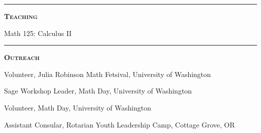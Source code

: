 \documentclass[12pt]{article}
\newcommand{\sectionheading}[1]
{
\bigskip %
\noindent
\hspace{-6.5mm}\textcolor{Gray}{\rule[.75mm]{21.5mm}{1mm}} %
\hspace{.2mm}	%
{\large{\textbf{\textsc{#1}}}} %
}
\newenvironment{date_section}
	{
	\vspace{-1ex}
	\leftmargini = 15ex
		\begin{itemize}[
			labelsep = *,
			labelwidth = 9ex,
			labelindent = 0ex,
			itemindent = !,
			font=\normalfont,
			align=parleft
		]{}
		\itemsep=-1.5mm
	}
	{\end{itemize}\vspace{-2ex}}
\newcommand{\yearmo}[2]{
	\item[
		{\makebox[1ex][r]{#1}}
		\hspace{1ex}
		{\makebox[1ex][l]{#2} }
		] }
\begin{document}
	\sectionheading{Teaching}%

		\begin{date_section}

			\yearmo{2014}{}%
				Math 125: Calculus II

		\end{date_section}

	\sectionheading{Outreach}%

			\begin{date_section}

				\yearmo{2015}{}
					Volunteer,
					Julia Robinson Math Fetsival,
					University of Washington

				\yearmo{2015}{}
					Sage Workshop Leader,
					Math Day,
					University of Washington

				\yearmo{2014}{}
					Volunteer,
					Math Day,
					University of Washington

				\yearmo{2010}{}
					Assistant Consular,
					Rotarian Youth Leadership Camp,
					Cottage Grove, OR

			\end{date_section}


\end{document}
